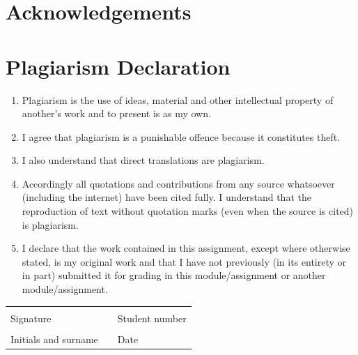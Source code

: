 \documentclass[12pt,a4paper]{report}
\begin{document}
\section*{Acknowledgements}

\newpage

\section*{Plagiarism Declaration}
\begin{enumerate}
\item Plagiarism is the use of ideas, material and other intellectual property of another's work and to present is as my own.
\item I agree that plagiarism is a punishable offence because it constitutes theft.
\item I also understand that direct translations are plagiarism.
\item Accordingly all quotations and contributions from any source whatsoever (including the internet) have been cited fully. I understand that the reproduction of text without quotation marks (even when the source is cited) is plagiarism.
\item I declare that the work contained in this assignment, except where otherwise stated, is my original work and that I have not previously (in its entirety or in part) submitted it for grading in this module/assignment or another module/assignment.
\end{enumerate}
\vspace{1cm}
\begin{table}[ht]
	\begin{center}
		\begin{tabular*}{15.5cm}{@{\extracolsep{\fill}}lll}
			\makebox[8cm]{\hrulefill} & & \makebox[6cm]{\hrulefill}\\
			Signature & & Student number\\[1cm]
			\makebox[8cm]{\hrulefill} & & \makebox[6cm]{\hrulefill}\\ 
			Initials and surname & & Date \\
		\end{tabular*}
	\end{center}
\end{table}
\newpage
\end{document}
